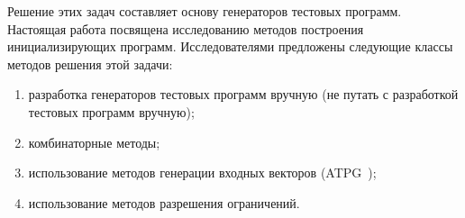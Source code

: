 Решение этих задач составляет основу генераторов тестовых программ.
Настоящая работа посвящена исследованию методов построения
инициализирующих программ. Исследователями предложены следующие
классы методов решения этой задачи:
\begin{enumerate}
\item разработка генераторов тестовых программ вручную (не путать с
разработкой тестовых программ вручную);
\item комбинаторные методы;
\item использование методов генерации входных векторов (ATPG~\cite{ATPGbook});
\item использование методов разрешения ограничений.
\end{enumerate}

